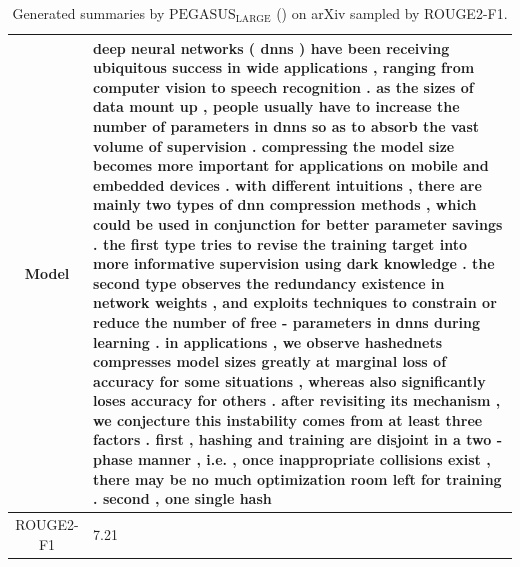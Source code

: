 \begin{table}[bth!]
\begin{tabular}{c|p{}}
\\ \hline
Model & 
deep neural networks ( dnns ) have been receiving ubiquitous success in wide applications , ranging from computer vision to speech recognition . as the sizes of data mount up , people usually have to increase the number of parameters in dnns so as to absorb the vast volume of supervision . compressing the model size becomes more important for applications on mobile and embedded devices . with different intuitions , there are mainly two types of dnn compression methods , which could be used in conjunction for better parameter savings . the first type tries to revise the training target into more informative supervision using dark knowledge . the second type observes the redundancy existence in network weights , and exploits techniques to constrain or reduce the number of free - parameters in dnns during learning . in applications , we observe hashednets compresses model sizes greatly at marginal loss of accuracy for some situations , whereas also significantly loses accuracy for others . after revisiting its mechanism , we conjecture this instability comes from at least three factors . first , hashing and training are disjoint in a two - phase manner , i.e. , once inappropriate collisions exist , there may be no much optimization room left for training . second , one single hash
\\ \hline
ROUGE2-F1 & 
7.21
\\ \hline
\end{tabular}
\caption{Generated summaries by $\text{PEGASUS}_{\text{LARGE}}$ (\gnews) on arXiv sampled by ROUGE2-F1.}
\end{table}
